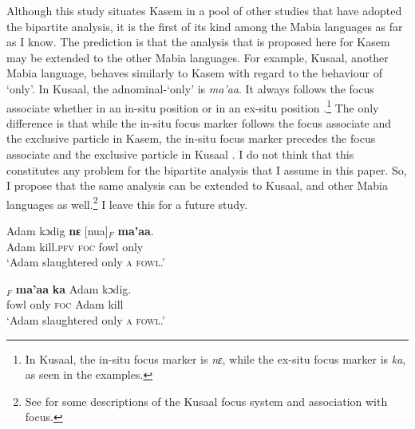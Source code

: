 \documentclass[output=paper,colorlinks,citecolor=brown,draftmode
]{langscibook}
\begin{document}
Although this study situates Kasem in a pool of other studies that have adopted the bipartite analysis, it is the first of its kind among the Mabia languages as far as I know. The prediction is that the analysis that is proposed here for Kasem may be extended to the other Mabia languages. For example, Kusaal, another Mabia language, behaves similarly to Kasem with regard to the behaviour of `only'. In Kusaal, the adnominal-`only' is \textit{ma'aa}. It always follows the focus associate whether in an in-situ position  or in an ex-situ position .\footnote{In Kusaal, the in-situ focus marker is \textit{nɛ}, while the ex-situ focus marker is \textit{ka}, as seen in the examples.} The only difference is that while the in-situ focus marker follows the focus associate and the exclusive particle in Kasem, the in-situ focus marker precedes the focus associate and the exclusive particle in Kusaal . I do not think that this constitutes any problem for the bipartite analysis that I assume in this paper. So, I propose that the same analysis can be extended to Kusaal, and other Mabia languages as well.\footnote{See \citet{abubakari2018aspects, abubakari2019contrastive} for some descriptions of the Kusaal focus system and association with focus.} I leave this for a future study.

\ea
\begin{xlist}
    
\ex \label{ex:Aremu:Kusaal in-situ AwF}
\gll Adam kɔdig \textbf{nɛ} [nua]$_F$ \textbf{ma'aa}.\\
	 Adam kill.\textsc{pfv} \textsc{foc} fowl only\\
\glt `Adam slaughtered only \textsc{a fowl}.'

\ex \label{ex:Aremu:Kusaal ex-situ AwF}
\gll [Nua]$_F$ \textbf{ma'aa} \textbf{ka} Adam kɔdig.\\
	 fowl only \textsc{foc} Adam kill\\
\glt `Adam slaughtered only \textsc{a fowl}.'

\end{xlist}
\z

\end{document}
